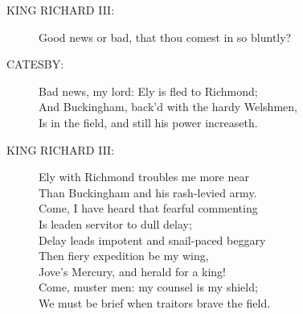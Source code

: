 \documentclass{article}
\begin{document}
\begin{description}
\item[KING RICHARD III:] 
\hspace{1pt}Good news or bad, that thou comest in so bluntly?\\
\end{description}
\begin{description}
\item[CATESBY:] 
\hspace{1pt}Bad news, my lord: Ely is fled to Richmond;\\
\hspace{1pt}And Buckingham, back'd with the hardy Welshmen,\\
\hspace{1pt}Is in the field, and still his power increaseth.\\
\end{description}
\begin{description}
\item[KING RICHARD III:] 
\hspace{1pt}Ely with Richmond troubles me more near\\
\hspace{1pt}Than Buckingham and his rash-levied army.\\
\hspace{1pt}Come, I have heard that fearful commenting\\
\hspace{1pt}Is leaden servitor to dull delay;\\
\hspace{1pt}Delay leads impotent and snail-paced beggary\\
\hspace{1pt}Then fiery expedition be my wing,\\
\hspace{1pt}Jove's Mercury, and herald for a king!\\
\hspace{1pt}Come, muster men: my counsel is my shield;\\
\hspace{1pt}We must be brief when traitors brave the field.\\
\end{description}
\centering{\it [Exeunt]}\\
\end{document}
